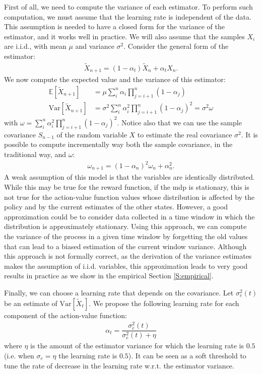 First of all, we need to compute the variance of each estimator. To perform such computation, we must assume that the learning rate is independent of the data. This assumption is needed to have a closed form for the variance of the estimator, and it works well in practice. We will also assume that the samples $X_i$ are i.i.d., with mean $\mu$ and variance $\sigma^2$. Consider the general form of the estimator:
\begin{align}
 \widetilde{X}_{n+1} = (1-\alpha_t)\widetilde{X}_{n}+\alpha_tX_{n}.
\end{align}
We now compute the expected value and the variance of this estimator:
\begin{align}
 \mathbb{E}\left[\widetilde{X}_{n+1}\right]& = \mu\sum_i^n \alpha_i \prod_{j=i+1}^{n} \left(1-\alpha_j\right)\\
 \mathrm{Var}\left[\widetilde{X}_{n+1}\right]& = \sigma^2\sum_i^n \alpha_i^2 \prod_{j=i+1}^{n} \left(1-\alpha_j\right)^2 = \sigma^2\omega
\end{align}
with $\omega=\sum_i^n \alpha_i^2 \prod_{j=i+1}^{n} \left(1-\alpha_j\right)^2$. Notice also that we can use the sample covariance $S_{n-1}$ of the random variable $X$ to estimate the real covariance $\sigma^2$. It is possible to compute incrementally way both the sample covariance, in the traditional way, and $\omega$:
\begin{align}
 \omega_{n+1}=(1-\alpha_n)^2\omega_n+\alpha_n^2.
\end{align}
A weak assumption of this model is that the variables are identically distributed. While this may be true for the reward function, if the \gls{mdp} is stationary, this is not true for the action-value function values whose distribution is affected by the policy and by the current estimates of the other states. However, a good approximation could be to consider data collected in a time window in which the distribution is approximately stationary. Using this approach, we can compute the variance of the process in a given time window by forgetting the old values that can lead to a biased estimation of the current window variance. Although this approach is not formally correct, as the derivation of the variance estimates makes the assumption of i.i.d. variables, this approximation leads to very good results in practice as we show in the empirical Section \ref{S:empirical}.

Finally, we can choose a learning rate that depends on the covariance. Let $\sigma_e^2(t)$ be an estimate of $\mathrm{Var}\left[\widetilde{X}_{t}\right]$. We propose the following learning rate for each component of the action-value function:
\begin{align}\label{eq:alpha_eq}
 \alpha_t=\dfrac{\sigma_e^2(t)}{\sigma_e^2(t)+\eta}
\end{align}
where $\eta$ is the amount of the estimator variance for which the learning rate is $0.5$ (i.e. when $\sigma_e=\eta$ the learning rate is $0.5$). It can be seen as a soft threshold to tune the rate of decrease in the learning rate w.r.t. the estimator variance.

